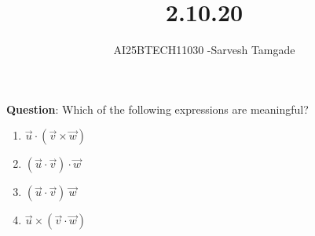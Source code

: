 \documentclass[journal]{IEEEtran}
\begin{document}

\vspace{3cm}

\title{2.10.20}
\author{AI25BTECH11030 -Sarvesh Tamgade}
{\let\newpage\relax\maketitle}

\renewcommand{\thefigure}{\theenumi}
\renewcommand{\thetable}{\theenumi}
\setlength{\intextsep}{10pt} 


\renewcommand{\thetable}{\theenumi}


\textbf{Question}:  Which of the following expressions are meaningful?
\begin{multicols}{2}
\begin{enumerate}[label=(\alph*)]
     
\item $\vec{u} \cdot (\vec{v} \times \vec{w})$
\item $(\vec{u} \cdot \vec{v}) \cdot \vec{w}$
\item $(\vec{u} \cdot \vec{v})\ \vec{w}$
\item $\vec{u} \times (\vec{v} \cdot \vec{w})$

\end{enumerate}
\end{multicols}
\end{document}
